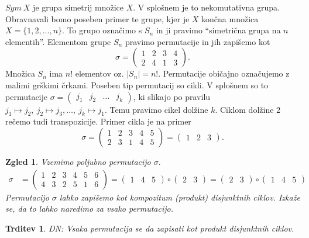 \documentclass[10pt, a4paper]{article}
\newtheorem{trditev}[izr]{Trditev}
\newtheorem{zgled}{Zgled}[section]
\begin{document}
$Sym\ X$ je grupa simetrij množice $X$. V splošnem je to nekomutativna grupa.
Obravnavali bomo poseben primer te grupe, kjer je $X$ končna množica
$X = \{1,2,\dots, n\}$.
To grupo označimo s $S_n$ in ji pravimo "`simetrična grupa na $n$ elementih"'. Elementom grupe $S_n$ pravimo permutacije in jih zapišemo kot
$$\sigma = \begin{pmatrix}
    1 & 2 & 3 & 4\\
    2 & 4 & 1 & 3
\end{pmatrix}.$$
Množica $S_n$ ima $n!$ elementov oz. $|S_n| = n!.$ Permutacije običajno označujemo z malimi grškimi črkami.
Poseben tip permutacij so cikli.
V splošnem so to permutacije
$\sigma = \begin{pmatrix}
    j_1 & j_2 & \dots & j_k
\end{pmatrix}$, ki slikajo po pravilu
$
    j_1 \mapsto j_2,\ 
    j_2 \mapsto j_3, 
    \dots,\ 
    j_k \mapsto j_1.
$
Temu pravimo cikel dolžine $k$. Ciklom dolžine $2$ rečemo tudi transpozicije.
Primer cikla je na primer
$$\sigma = \begin{pmatrix} 1 & 2 & 3 & 4 & 5\\ 2 & 3 & 1 & 4 & 5 \end{pmatrix} = \begin{pmatrix}
    1 & 2 & 3
\end{pmatrix}.$$
\begin{zgled}
    Vzemimo poljubno permutacijo $\sigma.$
    \begin{align*}
        \sigma &= \begin{pmatrix}
            1 & 2 & 3 & 4 & 5 & 6\\
            4 & 3 & 2 & 5 & 1 & 6
        \end{pmatrix}
        = \begin{pmatrix}
            1 & 4 & 5
        \end{pmatrix} \circ \begin{pmatrix}
            2 & 3
        \end{pmatrix} = \begin{pmatrix}
            2 & 3
        \end{pmatrix} \circ \begin{pmatrix}
            1 & 4 & 5
        \end{pmatrix}
    \end{align*}
    Permutacijo $\sigma$ lahko zapišemo kot kompozitum (produkt) disjunktnih ciklov. Izkaže se, da to lahko naredimo za vsako permutacijo.
\end{zgled}
\begin{trditev}
    DN: Vsaka permutacija se da zapisati kot produkt disjunktnih ciklov.
\end{trditev}
\end{document}
